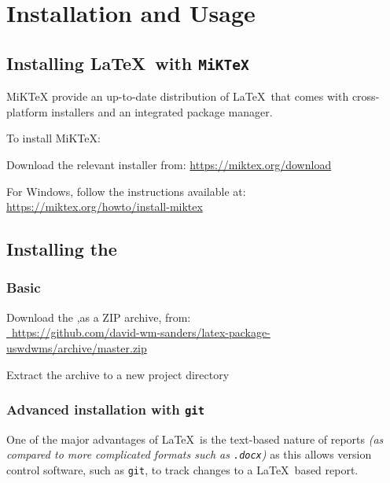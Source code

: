 \section{Installation and Usage}
\subsection{Installing \LaTeX\ with \texttt{MiKTeX}}
MiKTeX provide an up-to-date distribution of \LaTeX\ that comes with cross-platform installers and an integrated package manager.

To install MiKTeX:
\begin{methodology0}
  \item Download the relevant installer from: \href{https://miktex.org/download}{https://miktex.org/download}
  \item For Windows, follow the instructions available at: \href{https://miktex.org/howto/install-miktex}{https://miktex.org/howto/install-miktex}
\end{methodology0}

\subsection{Installing the \uswdwmspkg{}}
\subsubsection{Basic}
\begin{methodology0}
  \item Download the \uswdwmspkg{},as a ZIP archive, from:\\
    \href{https://github.com/david-wm-sanders/latex-package-uswdwms/archive/master.zip}{\faGithub\ https://github.com/david-wm-sanders/latex-package-uswdwms/archive/master.zip}
  \item Extract the archive to a new project directory
\end{methodology0}

\subsubsection{Advanced installation with \texttt{git}}
\label{example:sec:advancedinstallation}
One of the major advantages of \LaTeX\ is the text-based nature of reports \textit{(as compared to more complicated formats such as \texttt{.docx})} as this allows version control software, such as \texttt{git}, to track changes to a \LaTeX\ based report.

